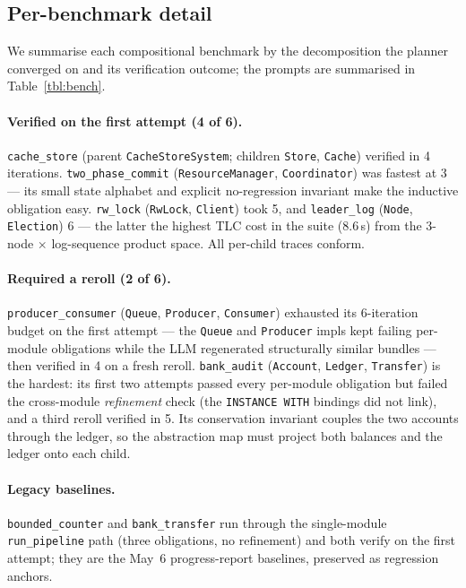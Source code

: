\documentclass[11pt]{article}
\begin{document}
\subsection{Per-benchmark detail}\label{ssec:bench-detail}

We summarise each compositional benchmark by the decomposition the planner
converged on and its verification outcome; the prompts are summarised in
Table~\ref{tbl:bench}.

\paragraph{Verified on the first attempt (4 of 6).}
\texttt{cache\_store} (parent \texttt{CacheStoreSystem}; children \texttt{Store},
\texttt{Cache}) verified in 4 iterations. \texttt{two\_phase\_commit}
(\texttt{ResourceManager}, \texttt{Coordinator}) was fastest at 3 --- its small state
alphabet and explicit no-regression invariant make the inductive obligation easy.
\texttt{rw\_lock} (\texttt{RwLock}, \texttt{Client}) took 5, and \texttt{leader\_log}
(\texttt{Node}, \texttt{Election}) 6 --- the latter the highest TLC cost in the suite
(8.6\,s) from the 3-node $\times$ log-sequence product space. All per-child traces
conform.

\paragraph{Required a reroll (2 of 6).}
\texttt{producer\_consumer} (\texttt{Queue}, \texttt{Producer}, \texttt{Consumer})
exhausted its 6-iteration budget on the first attempt --- the \texttt{Queue} and
\texttt{Producer} impls kept failing per-module obligations while the LLM regenerated
structurally similar bundles --- then verified in 4 on a fresh reroll.
\texttt{bank\_audit} (\texttt{Account}, \texttt{Ledger}, \texttt{Transfer}) is the
hardest: its first two attempts passed every per-module obligation but failed the
cross-module \emph{refinement} check (the \texttt{INSTANCE WITH} bindings did not link),
and a third reroll verified in 5. Its conservation invariant couples the two accounts
through the ledger, so the abstraction map must project both balances and the ledger
onto each child.

\paragraph{Legacy baselines.}
\texttt{bounded\_counter} and \texttt{bank\_transfer} run through the single-module
\texttt{run\_pipeline} path (three obligations, no refinement) and both verify on the
first attempt; they are the May~6 progress-report baselines, preserved as regression
anchors.
\end{document}
